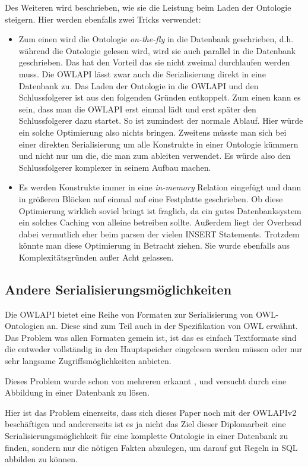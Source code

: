 Des Weiteren wird beschrieben, wie sie die Leistung beim Laden der Ontologie steigern. Hier werden ebenfalls zwei Tricks verwendet:
\begin{itemize}
  \item Zum einen wird die Ontologie \emph{on-the-fly} in die Datenbank geschrieben, d.h. während die Ontologie gelesen wird, wird sie auch parallel in die Datenbank geschrieben. Das hat den Vorteil das sie nicht zweimal durchlaufen werden muss. Die OWLAPI lässt zwar auch die Serialisierung direkt in eine Datenbank zu. Das Laden der Ontologie in die OWLAPI und den Schlussfolgerer ist aus den folgenden Gründen entkoppelt. Zum einen kann es sein, dass man die OWLAPI erst einmal lädt und erst später den Schlussfolgerer dazu startet. So ist zumindest der normale Ablauf. Hier würde ein solche Optimierung also nichts bringen. Zweitens müsste man sich bei einer direkten Serialisierung um alle Konstrukte in einer Ontologie kümmern und nicht nur um die, die man zum ableiten verwendet. Es würde also den Schlussfolgerer komplexer in seinem Aufbau machen.
  \item Es werden Konstrukte immer in eine \emph{in-memory} Relation eingefügt und dann in größeren Blöcken auf einmal auf eine Festplatte geschrieben. Ob diese Optimierung wirklich soviel bringt ist fraglich, da ein gutes Datenbanksystem ein solches Caching von alleine betreiben sollte. Außerdem liegt der Overhead dabei vermutlich eher beim parsen der vielen INSERT Statements. Trotzdem könnte man diese Optimierung in Betracht ziehen. Sie wurde ebenfalls aus Komplexitätsgründen außer Acht gelassen.
\end{itemize}

\subsection{Andere Serialisierungsmöglichkeiten}
Die OWLAPI bietet eine Reihe von Formaten zur Serialisierung von OWL-Ontologien an. Diese sind zum Teil auch in der Spezifikation von OWL erwähnt. Das Problem was allen Formaten gemein ist, ist das es einfach Textformate sind die entweder vollständig in den Hauptspeicher eingelesen werden müssen oder nur sehr langsame Zugriffsmöglichkeiten anbieten.

Dieses Problem wurde schon von mehreren erkannt \cite{Kleb2009ProtegeDB}, \cite{Kleb2009OWLDB} und versucht durch eine Abbildung in einer Datenbank zu lösen.

Hier ist das Problem einerseits, dass sich dieses Paper noch mit der OWLAPIv2 beschäftigen und andererseits ist es ja nicht das Ziel dieser Diplomarbeit  eine Serialisierungsmöglichkeit für eine komplette Ontologie in einer Datenbank zu finden, sondern nur die nötigen Fakten abzulegen, um darauf gut Regeln in SQL abbilden zu können.